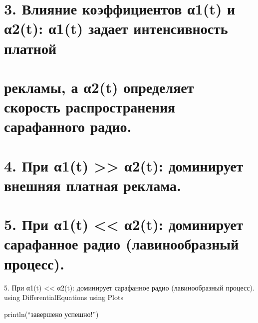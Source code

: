 \documentclass[
  ignorenonframetext,
  aspectratio=169,
  russian,
]{beamer}
\begin{document}
\section{3. Влияние коэффициентов α1(t) и α2(t): α1(t) задает
интенсивность
платной}\label{ux432ux43bux438ux44fux43dux438ux435-ux43aux43eux44dux444ux444ux438ux446ux438ux435ux43dux442ux43eux432-ux3b11t-ux438-ux3b12t-ux3b11t-ux437ux430ux434ux430ux435ux442-ux438ux43dux442ux435ux43dux441ux438ux432ux43dux43eux441ux442ux44c-ux43fux43bux430ux442ux43dux43eux439}

\section{рекламы, а α2(t) определяет скорость распространения
сарафанного
радио.}\label{ux440ux435ux43aux43bux430ux43cux44b-ux430-ux3b12t-ux43eux43fux440ux435ux434ux435ux43bux44fux435ux442-ux441ux43aux43eux440ux43eux441ux442ux44c-ux440ux430ux441ux43fux440ux43eux441ux442ux440ux430ux43dux435ux43dux438ux44f-ux441ux430ux440ux430ux444ux430ux43dux43dux43eux433ux43e-ux440ux430ux434ux438ux43e.}

\section{4. При α1(t) \textgreater\textgreater{} α2(t): доминирует
внешняя платная
реклама.}\label{ux43fux440ux438-ux3b11t-ux3b12t-ux434ux43eux43cux438ux43dux438ux440ux443ux435ux442-ux432ux43dux435ux448ux43dux44fux44f-ux43fux43bux430ux442ux43dux430ux44f-ux440ux435ux43aux43bux430ux43cux430.}

\section{5. При α1(t) \textless\textless{} α2(t): доминирует сарафанное
радио (лавинообразный
процесс).}\label{ux43fux440ux438-ux3b11t-ux3b12t-ux434ux43eux43cux438ux43dux438ux440ux443ux435ux442-ux441ux430ux440ux430ux444ux430ux43dux43dux43eux435-ux440ux430ux434ux438ux43e-ux43bux430ux432ux438ux43dux43eux43eux431ux440ux430ux437ux43dux44bux439-ux43fux440ux43eux446ux435ux441ux441.}

\begin{frame}{5. При α1(t) \textless\textless{} α2(t): доминирует
сарафанное радио (лавинообразный процесс).}
using DifferentialEquations using Plots

println(\enquote{ завершено успешно!})
\end{frame}
\end{document}
